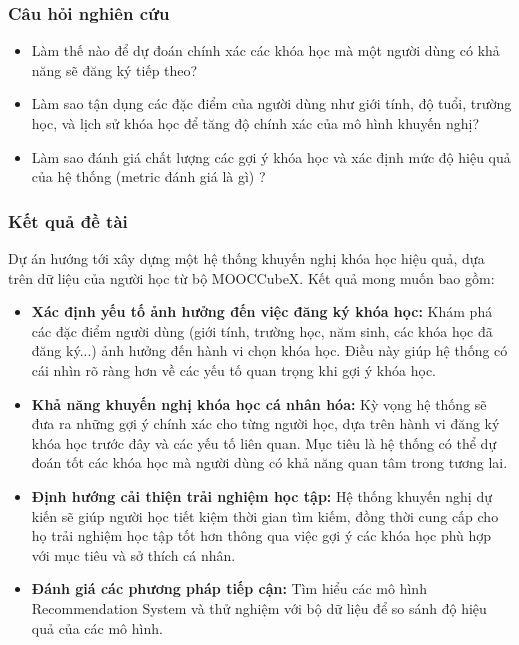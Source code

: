 \subsubsection{Câu hỏi nghiên cứu}
\begin{itemize}
    \item Làm thế nào để dự đoán chính xác các khóa học mà một người dùng có khả năng sẽ đăng ký tiếp theo?
    \item Làm sao tận dụng các đặc điểm của người dùng như giới tính, độ tuổi, trường học, và lịch sử khóa học để tăng độ chính xác của mô hình khuyến nghị?
    \item Làm sao đánh giá chất lượng các gợi ý khóa học và xác định mức độ hiệu quả của hệ thống (metric đánh giá là gì) ?
\end{itemize}
\subsubsection{Kết quả đề tài}
Dự án hướng tới xây dựng một hệ thống khuyến nghị khóa học hiệu quả, dựa trên dữ liệu của người học từ bộ MOOCCubeX. Kết quả mong muốn bao gồm:
\begin{itemize}
    \item \textbf{Xác định yếu tố ảnh hưởng đến việc đăng ký khóa học:} Khám phá các đặc điểm người dùng (giới tính, trường học, năm sinh, các khóa học đã đăng ký...) ảnh hưởng đến hành vi chọn khóa học. Điều này giúp hệ thống có cái nhìn rõ ràng hơn về các yếu tố quan trọng khi gợi ý khóa học.
    \item \textbf{Khả năng khuyến nghị khóa học cá nhân hóa:} Kỳ vọng hệ thống sẽ đưa ra những gợi ý chính xác cho từng người học, dựa trên hành vi đăng ký khóa học trước đây và các yếu tố liên quan. Mục tiêu là hệ thống có thể dự đoán tốt các khóa học mà người dùng có khả năng quan tâm trong tương lai.
    \item \textbf{Định hướng cải thiện trải nghiệm học tập:} Hệ thống khuyến nghị dự kiến sẽ giúp người học tiết kiệm thời gian tìm kiếm, đồng thời cung cấp cho họ trải nghiệm học tập tốt hơn thông qua việc gợi ý các khóa học phù hợp với mục tiêu và sở thích cá nhân.
    \item \textbf{Đánh giá các phương pháp tiếp cận:} Tìm hiểu các mô hình Recommendation System và thử nghiệm với bộ dữ liệu để so sánh độ hiệu quả của các mô hình.
\end{itemize}
